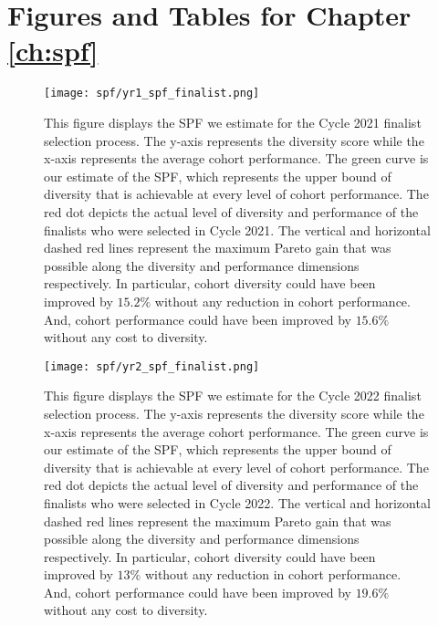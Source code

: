 \newpage
\section{Figures and Tables for Chapter \ref{ch:spf}}\label{app:spffigures}
\begin{figure}[!hbtp]
    \centering
    \label{fig:spf_2021_full}
    \texttt{[image: spf/yr1\_spf\_finalist.png]} 
    \caption{This figure displays the SPF we estimate for the Cycle 2021 finalist selection process. The y-axis represents the diversity score while the x-axis represents the average cohort performance. The green curve is our estimate of the SPF, which represents the upper bound of diversity that is achievable at every level of cohort performance. The red dot depicts the actual level of diversity and performance of the finalists who were selected in Cycle 2021. The vertical and horizontal dashed red lines represent the maximum Pareto gain that was possible along the diversity and performance dimensions respectively. In particular, cohort diversity could have been improved by $15.2\%$ without any reduction in cohort performance. And, cohort performance could have been improved by $15.6\%$ without any cost to diversity.}
\end{figure}
    
\begin{figure}[!hbtp]
    \centering
    \label{fig:spf_2022_full}
    \texttt{[image: spf/yr2\_spf\_finalist.png]} 
    \caption{This figure displays the SPF we estimate for the Cycle 2022 finalist selection process. The y-axis represents the diversity score while the x-axis represents the average cohort performance. The green curve is our estimate of the SPF, which represents the upper bound of diversity that is achievable at every level of cohort performance. The red dot depicts the actual level of diversity and performance of the finalists who were selected in Cycle 2022. The vertical and horizontal dashed red lines represent the maximum Pareto gain that was possible along the diversity and performance dimensions respectively. In particular, cohort diversity could have been improved by $13\%$ without any reduction in cohort performance. And, cohort performance could have been improved by $19.6\%$ without any cost to diversity.}
\end{figure}
